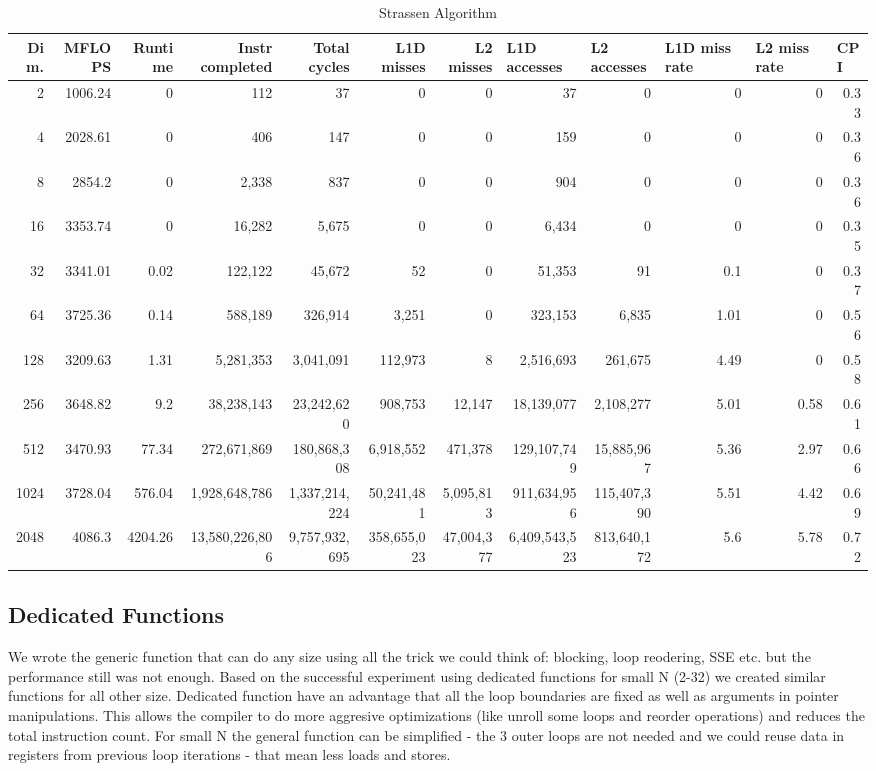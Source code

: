 \documentclass{article}
\begin{document}
\begin{table}[htbp]
\tiny
\caption{Strassen Algorithm}
\begin{tabular}{|r|r|r|r|r|r|r|r|r|r|r|r|}
\hline
Dim. &   MFLOPS &     Runtime & Instr completed & Total cycles & L1D misses & L2 misses & \multicolumn{1}{l|}{L1D accesses} & \multicolumn{1}{l|}{ L2 accesses} & \multicolumn{1}{l|}{L1D miss rate} & \multicolumn{1}{l|}{L2 miss rate} & \multicolumn{1}{l|}{CPI} \\ \hline
2 & 1006.24 & 0 & 112 & 37 & 0 & 0 & 37 & 0 & 0 & 0 & 0.33 \\ \hline
4 & 2028.61 & 0 & 406 & 147 & 0 & 0 & 159 & 0 & 0 & 0 & 0.36 \\ \hline
8 & 2854.2 & 0 & 2,338 & 837 & 0 & 0 & 904 & 0 & 0 & 0 & 0.36 \\ \hline
16 & 3353.74 & 0 & 16,282 & 5,675 & 0 & 0 & 6,434 & 0 & 0 & 0 & 0.35 \\ \hline
32 & 3341.01 & 0.02 & 122,122 & 45,672 & 52 & 0 & 51,353 & 91 & 0.1 & 0 & 0.37 \\ \hline
64 & 3725.36 & 0.14 & 588,189 & 326,914 & 3,251 & 0 & 323,153 & 6,835 & 1.01 & 0 & 0.56 \\ \hline
128 & 3209.63 & 1.31 & 5,281,353 & 3,041,091 & 112,973 & 8 & 2,516,693 & 261,675 & 4.49 & 0 & 0.58 \\ \hline
256 & 3648.82 & 9.2 & 38,238,143 & 23,242,620 & 908,753 & 12,147 & 18,139,077 & 2,108,277 & 5.01 & 0.58 & 0.61 \\ \hline
512 & 3470.93 & 77.34 & 272,671,869 & 180,868,308 & 6,918,552 & 471,378 & 129,107,749 & 15,885,967 & 5.36 & 2.97 & 0.66 \\ \hline
1024 & 3728.04 & 576.04 & 1,928,648,786 & 1,337,214,224 & 50,241,481 & 5,095,813 & 911,634,956 & 115,407,390 & 5.51 & 4.42 & 0.69 \\ \hline
2048 & 4086.3 & 4204.26 & 13,580,226,806 & 9,757,932,695 & 358,655,023 & 47,004,377 & 6,409,543,523 & 813,640,172 & 5.6 & 5.78 & 0.72 \\ \hline
\end{tabular}
\label{}
\end{table}

\subsection{Dedicated Functions}
We wrote the generic function that can do any size using all the trick we could think of: blocking, loop reodering, SSE etc. but the performance still was not enough. Based on the successful experiment using dedicated functions for small N (2-32) we created similar functions for all other size. Dedicated function have an advantage that all the loop boundaries are fixed as well as arguments in pointer manipulations. This allows the compiler to do more aggresive optimizations (like unroll some loops and reorder operations) and reduces the total instruction count.  For small N  the general function can be simplified - the 3 outer loops are not needed and we could reuse data in registers from previous loop iterations  - that mean less loads and stores.
\end{document}
